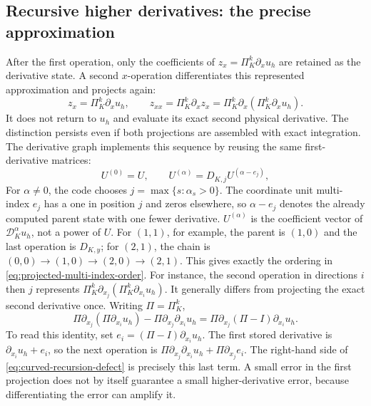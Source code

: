 \subsection{Recursive higher derivatives: the precise approximation}
\label{sec:curved-recursive-derivatives}
After the first operation, only the coefficients of $z_x=
\Pi_K^k\partial_xu_h$ are retained as the derivative state. A second
$x$-operation differentiates this represented approximation and projects
again:
\begin{equation}
 z_x=\Pi_K^k\partial_xu_h,\qquad
 z_{xx}=\Pi_K^k\partial_x z_x
       =\Pi_K^k\partial_x(\Pi_K^k\partial_xu_h).
\end{equation}
It does not return to $u_h$ and evaluate its exact second physical
derivative. The distinction persists even if both projections are assembled
with exact integration. The derivative graph implements this sequence by
reusing the same first-derivative matrices:
\begin{equation}
 U^{(0)}=U,\qquad U^{(\alpha)}=D_{K,j}U^{(\alpha-e_j)},
 \label{eq:curved-recursion}
\end{equation}
For $\alpha\ne0$, the code chooses $j=\max\{s:\alpha_s>0\}$.
The coordinate unit multi-index $e_j$ has a one in position $j$ and zeros
elsewhere, so $\alpha-e_j$ denotes the already computed parent state with
one fewer derivative. $U^{(\alpha)}$ is the coefficient vector of
$\mathscr D_K^\alpha u_h$, not a power of $U$. For $(1,1)$, for example,
the parent is $(1,0)$ and the last operation is $D_{K,y}$; for $(2,1)$,
the chain is $(0,0)\to(1,0)\to(2,0)\to(2,1)$. This gives exactly the
ordering in \cref{eq:projected-multi-index-order}.
For instance, the second operation in directions $i$ then $j$ represents
$\Pi_K^k\partial_{x_j}(\Pi_K^k\partial_{x_i}u_h)$. It generally differs
from projecting the exact second derivative once. Writing $\Pi=\Pi_K^k$,
\begin{equation}
 \Pi\partial_{x_j}(\Pi\partial_{x_i}u_h)
 -\Pi\partial_{x_j}\partial_{x_i}u_h
 =\Pi\partial_{x_j}(\Pi-I)\partial_{x_i}u_h.
 \label{eq:curved-recursion-defect}
\end{equation}
To read this identity, set $e_i=(\Pi-I)\partial_{x_i}u_h$.
The first stored derivative is $\partial_{x_i}u_h+e_i$, so the next
operation is $\Pi\partial_{x_j}\partial_{x_i}u_h+
\Pi\partial_{x_j}e_i$. The right-hand side of
\cref{eq:curved-recursion-defect} is precisely this last term.
A small error in the first projection does not by itself guarantee a small
higher-derivative error, because differentiating the error can amplify it.

